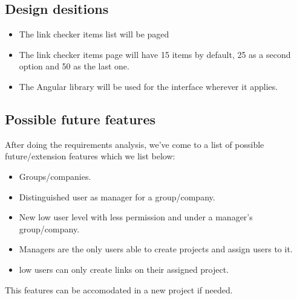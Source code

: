 \subsection{Design desitions}
\begin{itemize}
	\item The link checker items list will be paged
	\item The link checker items page will have 15 items by default, 25 as a second option and 50 as the last one.
	\item The Angular library will be used for the interface wherever it applies.
\end{itemize}

\subsection{Possible future features}
After doing the requirements analysis, we've come to a list of possible future/extension features which we list below:
\begin{itemize}
	\item Groups/companies.
	\item Distinguished user as manager for a group/company.
	\item New low user level with less permission and under a manager's group/company.
	\item Managers are the only users able to create projects and assign users to it.
	\item low users can only create links on their assigned project.
\end{itemize}

This features can be accomodated in a new project if needed.